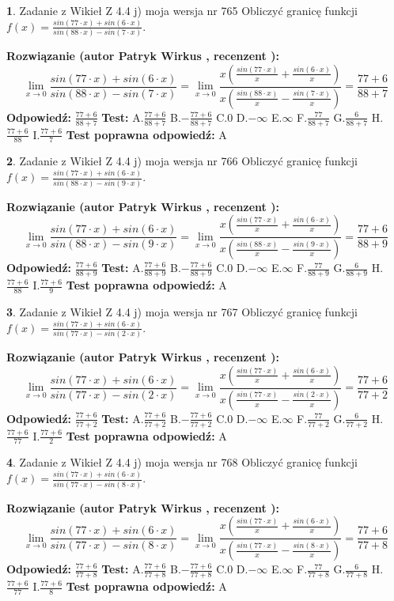 \documentclass[12pt, a4paper]{article}
\theoremstyle{definition} %
\newtheorem{zad}{}
\newcommand{\zadStart}[1]{\begin{zad}#1\newline}
\newcommand{\zadStop}{\end{zad}}
\newcommand{\rozwStart}[2]{\noindent \textbf{Rozwiązanie (autor #1 , recenzent #2): }\newline}
\newcommand{\rozwStop}{\newline}
\newcommand{\odpStart}{\noindent \textbf{Odpowiedź:}\newline}
\newcommand{\odpStop}{\newline}
\newcommand{\testStart}{\noindent \textbf{Test:}\newline}
\newcommand{\testStop}{\newline}
\newcommand{\kluczStart}{\noindent \textbf{Test poprawna odpowiedź:}\newline}
\newcommand{\kluczStop}{\newline}
\begin{document}
\zadStart{Zadanie z Wikieł Z 4.4 j) moja wersja nr 765}
Obliczyć granicę funkcji $f(x)=\frac{sin(77\cdot x) +sin(6\cdot x)}{sin(88\cdot x) -sin(7\cdot x)}$.
\zadStop
\rozwStart{Patryk Wirkus}{}
$$\lim\limits_{x\to 0}\frac{sin(77\cdot x) +sin(6\cdot x)}{sin(88\cdot x) -sin(7\cdot x)}=\lim\limits_{x\to 0}\frac{x(\frac{sin(77\cdot x)}{x}+\frac{sin(6\cdot x)}{x})}{x(\frac{sin(88\cdot x)}{x}-\frac{sin(7\cdot x)}{x})}=\frac{77+6}{88+7}$$
\rozwStop
\odpStart
$\frac{77+6}{88+7}$
\odpStop
\testStart
A.$\frac{77+6}{88+7}$
B.$-\frac{77+6}{88+7}$
C.$0$
D.$-\infty$
E.$\infty$
F.$\frac{77}{88+7}$
G.$\frac{6}{88+7}$
H.$\frac{77+6}{88}$
I.$\frac{77+6}{7}$
\testStop
\kluczStart
A
\kluczStop



\zadStart{Zadanie z Wikieł Z 4.4 j) moja wersja nr 766}
Obliczyć granicę funkcji $f(x)=\frac{sin(77\cdot x) +sin(6\cdot x)}{sin(88\cdot x) -sin(9\cdot x)}$.
\zadStop
\rozwStart{Patryk Wirkus}{}
$$\lim\limits_{x\to 0}\frac{sin(77\cdot x) +sin(6\cdot x)}{sin(88\cdot x) -sin(9\cdot x)}=\lim\limits_{x\to 0}\frac{x(\frac{sin(77\cdot x)}{x}+\frac{sin(6\cdot x)}{x})}{x(\frac{sin(88\cdot x)}{x}-\frac{sin(9\cdot x)}{x})}=\frac{77+6}{88+9}$$
\rozwStop
\odpStart
$\frac{77+6}{88+9}$
\odpStop
\testStart
A.$\frac{77+6}{88+9}$
B.$-\frac{77+6}{88+9}$
C.$0$
D.$-\infty$
E.$\infty$
F.$\frac{77}{88+9}$
G.$\frac{6}{88+9}$
H.$\frac{77+6}{88}$
I.$\frac{77+6}{9}$
\testStop
\kluczStart
A
\kluczStop



\zadStart{Zadanie z Wikieł Z 4.4 j) moja wersja nr 767}
Obliczyć granicę funkcji $f(x)=\frac{sin(77\cdot x) +sin(6\cdot x)}{sin(77\cdot x) -sin(2\cdot x)}$.
\zadStop
\rozwStart{Patryk Wirkus}{}
$$\lim\limits_{x\to 0}\frac{sin(77\cdot x) +sin(6\cdot x)}{sin(77\cdot x) -sin(2\cdot x)}=\lim\limits_{x\to 0}\frac{x(\frac{sin(77\cdot x)}{x}+\frac{sin(6\cdot x)}{x})}{x(\frac{sin(77\cdot x)}{x}-\frac{sin(2\cdot x)}{x})}=\frac{77+6}{77+2}$$
\rozwStop
\odpStart
$\frac{77+6}{77+2}$
\odpStop
\testStart
A.$\frac{77+6}{77+2}$
B.$-\frac{77+6}{77+2}$
C.$0$
D.$-\infty$
E.$\infty$
F.$\frac{77}{77+2}$
G.$\frac{6}{77+2}$
H.$\frac{77+6}{77}$
I.$\frac{77+6}{2}$
\testStop
\kluczStart
A
\kluczStop



\zadStart{Zadanie z Wikieł Z 4.4 j) moja wersja nr 768}
Obliczyć granicę funkcji $f(x)=\frac{sin(77\cdot x) +sin(6\cdot x)}{sin(77\cdot x) -sin(8\cdot x)}$.
\zadStop
\rozwStart{Patryk Wirkus}{}
$$\lim\limits_{x\to 0}\frac{sin(77\cdot x) +sin(6\cdot x)}{sin(77\cdot x) -sin(8\cdot x)}=\lim\limits_{x\to 0}\frac{x(\frac{sin(77\cdot x)}{x}+\frac{sin(6\cdot x)}{x})}{x(\frac{sin(77\cdot x)}{x}-\frac{sin(8\cdot x)}{x})}=\frac{77+6}{77+8}$$
\rozwStop
\odpStart
$\frac{77+6}{77+8}$
\odpStop
\testStart
A.$\frac{77+6}{77+8}$
B.$-\frac{77+6}{77+8}$
C.$0$
D.$-\infty$
E.$\infty$
F.$\frac{77}{77+8}$
G.$\frac{6}{77+8}$
H.$\frac{77+6}{77}$
I.$\frac{77+6}{8}$
\testStop
\kluczStart
A
\kluczStop
\end{document}
